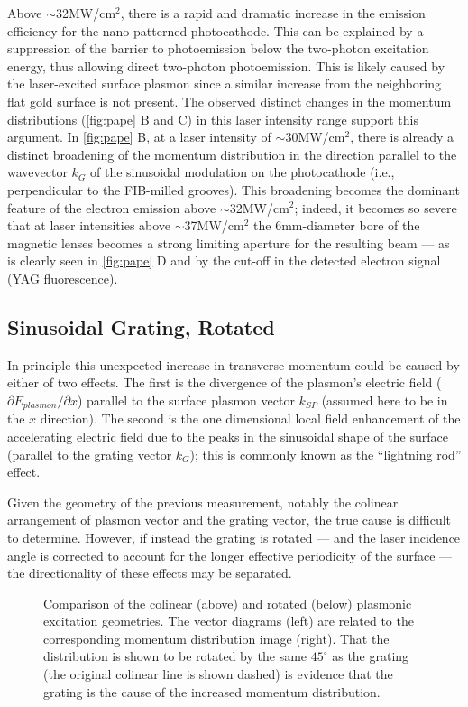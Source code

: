 Above $\sim$32MW/cm$^2$, there is a rapid and dramatic increase in the emission efficiency for the nano-patterned photocathode.
This can be explained by a suppression of the barrier to photoemission below the two-photon excitation energy, thus allowing direct two-photon photoemission.
This is likely caused by the laser-excited surface plasmon since a similar increase from the neighboring flat gold surface is not present.
The observed distinct changes in the momentum distributions (\ref{fig:pape} B and C) in this laser intensity range support this argument.
In \ref{fig:pape} B, at a laser intensity of $\sim$30MW/cm$^2$, there is already a distinct broadening of the momentum distribution in the direction parallel to the wavevector $k_G$ of the sinusoidal modulation on the photocathode (i.e., perpendicular to the FIB-milled grooves). 
This broadening becomes the dominant feature of the electron emission above $\sim$32MW/cm$^2$; indeed, it becomes so severe that at laser intensities above $\sim$37MW/cm$^2$ the 6mm-diameter bore of the magnetic lenses becomes a strong limiting aperture for the resulting beam --- as is clearly seen in \ref{fig:pape} D and by the cut-off in the detected electron signal (YAG fluorescence).

\subsection{Sinusoidal Grating, Rotated}

In principle this unexpected increase in transverse momentum could be caused by either of two effects.
The first is the divergence of the plasmon's electric field ($\partial E_{plasmon} / \partial x$) parallel to the surface plasmon vector $k_{SP}$ (assumed here to be in the $x$ direction).
The second is the one dimensional local field enhancement of the accelerating electric field due to the peaks in the sinusoidal shape of the surface (parallel to the grating vector $k_G$); this is commonly known as the ``lightning rod'' effect.

Given the geometry of the previous measurement, notably the colinear arrangement of plasmon vector and the grating vector, the true cause is difficult to determine.
However, if instead the grating is rotated --- and the laser incidence angle is corrected to account for the longer effective periodicity of the surface --- the directionality of these effects may be separated.

\begin{figure}
  \centering
  
  \caption{
    Comparison of the colinear (above) and rotated (below) plasmonic excitation geometries.
    The vector diagrams (left) are related to the corresponding momentum distribution image (right).
    That the distribution is shown to be rotated by the same $45^{\circ}$ as the grating (the original colinear line is shown dashed) is evidence that the grating is the cause of the increased momentum distribution.
  }
  \label{fig:rotated}
\end{figure}

